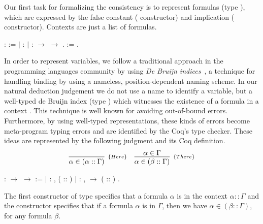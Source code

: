Our first task for formalizing the consistency is to represent formulas (type \coqdocvar{$\alpha$}), which
are expressed by the false constant ( constructor) and implication ( constructor).
Contexts are just a list of formulas.
\begin{coqdoccode}
\coqdocemptyline
\coqdocnoindent
{} \coqdocvar{$\alpha$} :  :=\coqdoceol
\coqdocnoindent
\ensuremath{|}  : \coqdocvar{$\alpha$}\coqdoceol
\coqdocnoindent
\ensuremath{|}  : \coqdocvar{$\alpha$} \ensuremath{\rightarrow} \coqdocvar{$\alpha$} \ensuremath{\rightarrow} \coqdocvar{$\alpha$}.\coqdoceol
\coqdocemptyline
\coqdocnoindent
{} \coqdocvar{$\Gamma$} :=  \coqdocvar{$\alpha$}.\coqdoceol
\coqdocemptyline
\end{coqdoccode}
In order to represent variables, we follow a traditional approach in the programming languages community
by using \emph{De Bruijn indices}~\cite{DeBruijn71}, a technique for handling binding by using a
nameless, position-dependent naming scheme. In our natural deduction judgement we do not
use a name to identify a variable, but a well-typed de Bruijn index (type ) which witnesses the existence
of a formula \coqdocvar{$\alpha$} in a context \coqdocvar{$\Gamma$}. This technique is well known for avoiding out-of-bound errors. Furthermore, by
using well-typed representations, these kinds of errors become meta-program typing errors and are identified
by the Coq's type checker. These ideas are represented by the following judgment and its Coq definition.
\[
\begin{array}{cc}
\infer[_{\{Here\}}]{\alpha \in (\alpha :: \Gamma)}{} &
\infer[_{\{There\}}]{\alpha \in (\beta :: \Gamma)}{\alpha \in \Gamma}
\end{array}
\]
 \begin{coqdoccode}
\coqdocemptyline
\coqdocnoindent
{}  : \coqdocvar{$\Gamma$} \ensuremath{\rightarrow} \coqdocvar{$\alpha$} \ensuremath{\rightarrow}  :=\coqdoceol
\coqdocnoindent
\ensuremath{|}  : \coqdockw{\ensuremath{\forall}}  ,  ( :: ) \coqdoceol
\coqdocnoindent
\ensuremath{|}  : \coqdockw{\ensuremath{\forall}}   ,    \ensuremath{\rightarrow}  ( :: ) .\coqdoceol
\coqdocemptyline
\end{coqdoccode}
The first constructor of type  specifies that a formula $\alpha$ is in the context $\alpha :: \Gamma$ and
the constructor  specifies that if a formula $\alpha$ is in $\Gamma$, then we have
 $\alpha \in (\beta :: \Gamma)$, for any formula $\beta$.


